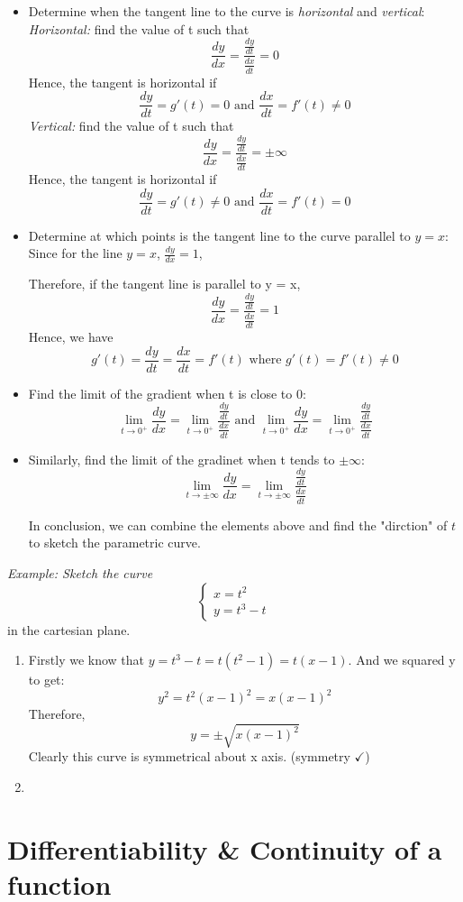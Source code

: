 \documentclass[12pt]{report}
\begin{document}
\begin{itemize}
    \item Determine when the tangent line to the curve is \emph{horizontal} and \emph{vertical}:
    \newpage
    \emph{Horizontal:} find the value of t such that
    $$
    \frac{dy}{dx} = \frac{\frac{dy}{dt}}{\frac{dx}{dt}} = 0
    $$
     \indent Hence, the tangent is horizontal if
     $$
    \frac{dy}{dt} =  g'(t) = 0 \text{ and }\frac{dx}{dt} = f'(t) \neq 0
     $$
     \emph{Vertical:} find the value of t such that
     $$
     \frac{dy}{dx} = \frac{\frac{dy}{dt}}{\frac{dx}{dt}} = \pm \infty
     $$
     \indent Hence, the tangent is horizontal if
     $$
    \frac{dy}{dt} =  g'(t) \neq 0\text{ and } \frac{dx}{dt} = f'(t) = 0
     $$
    \item Determine at which points is the tangent line to the curve parallel to $y = x$:
    \newline Since for the line $y = x$, $\frac{dy}{dx} = 1$,

    Therefore, if the tangent line is parallel to y = x, 
    $$
    \frac{dy}{dx} = \frac{\frac{dy}{dt}}{\frac{dx}{dt}} = 1
    $$
    \newline Hence, we have 
    $$
    g'(t) = \frac{dy}{dt} = \frac{dx}{dt} = f'(t)
    \text{ where } g'(t) = f'(t) \neq 0$$
    \item Find the limit of the gradient when t is close to 0:
    \newline  $$
    \lim_{t \to 0^+} \frac{dy}{dx} = \lim_{t \to 0^+} \frac{\frac{dy}{dt}}{\frac{dx}{dt}}
    \text{ and }
    \lim_{t \to 0^+} \frac{dy}{dx} = \lim_{t \to 0^+} \frac{\frac{dy}{dt}}{\frac{dx}{dt}}
    $$
    \item Similarly, find the limit of the gradinet when t tends to $\pm \infty$:
    \newline $$
    \lim_{t \to \pm \infty} \frac{dy}{dx} = \lim_{t \to \pm \infty} \frac{\frac{dy}{dt}}{\frac{dx}{dt}}
    $$
    
    In conclusion, we can combine the elements above and find the "dirction" of $t$ to sketch the parametric curve. 
\end{itemize}
 
\newpage
\emph{Example: Sketch the curve}
$$
\left\{\begin{array}{ll}
x = t^2 
\\ y = t^3 - t
\end{array}\right.
$$
\indent in the cartesian plane.

\begin{enumerate}
    \item Firstly we know that $y = t^3 - t = t(t^2 - 1) = t(x - 1)$.
    \newline And we squared y to get:
    $$
    y^2 = t^2(x - 1)^2 = x(x - 1)^2
    $$
    Therefore, 
    $$
    y = \pm \sqrt{x(x - 1)^2}
    $$
    Clearly this curve is symmetrical about x axis. (symmetry $\checkmark$)
    \item 
\end{enumerate}
    


\section{Differentiability \& Continuity of a function}
\end{document}
